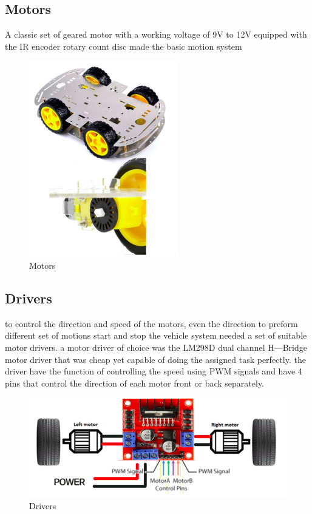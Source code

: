\subsection{Motors}
A classic set of geared motor with a working voltage of 9V to 12V
equipped with the IR encoder rotary count disc made the basic motion system
\begin{figure}[h]
    \centering
    \includegraphics[scale=.5]{figures/9-3.png}
    \caption{Motors}
    \label{fig:motors}
\end{figure}
\subsection{Drivers}
to control the direction and speed of the motors, even the direction to preform different set of
motions start and stop the vehicle system needed a set of suitable motor drivers.
a motor driver of choice was the LM298D dual channel H—Bridge motor driver that was cheap yet
capable of doing the assigned task perfectly.
the driver have the function of controlling the speed using PWM signals and have 4 pins that control
the direction of each motor front or back separately.

\begin{figure}[h]
    \centering
    \includegraphics[scale=.5]{figures/9-4.png}
    \caption{Drivers}
\end{figure}


